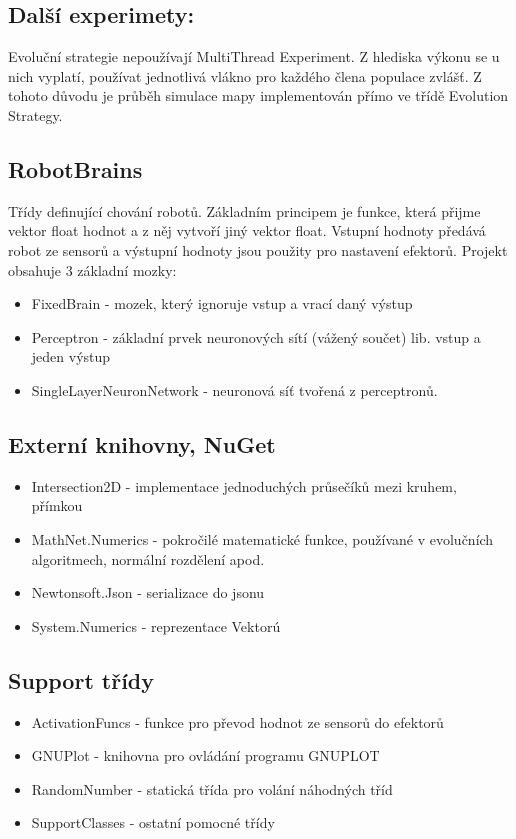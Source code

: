 \documentclass[12pt, oneside]{article}
\begin{document}
\subsection{Další experimety:}
Evoluční strategie nepoužívají MultiThread Experiment. Z hlediska výkonu se u nich vyplatí, používat jednotlivá vlákno pro každého člena populace zvlášť. Z tohoto důvodu je průběh simulace mapy implementován přímo ve třídě Evolution Strategy. 
\subsection{RobotBrains} 
Třídy definující chování robotů. Základním principem je funkce, která přijme vektor float hodnot a  z něj vytvoří jiný vektor float. Vstupní hodnoty předává robot ze sensorů a výstupní hodnoty jsou použity pro nastavení efektorů. Projekt obsahuje 3 základní mozky:
\begin{itemize}
\item FixedBrain - mozek, který ignoruje vstup a vrací daný výstup 
\item Perceptron - základní prvek neuronových sítí (vážený součet)  lib. vstup a jeden výstup
\item SingleLayerNeuronNetwork - neuronová síť tvořená z perceptronů.
\end{itemize}

\subsection{Externí knihovny, NuGet}
\begin{itemize}
\item Intersection2D - implementace jednoduchých průsečíků mezi kruhem, přímkou 
\item MathNet.Numerics - pokročilé matematické funkce, používané v evolučních  algoritmech, normální rozdělení apod.
\item Newtonsoft.Json - serializace do jsonu
\item System.Numerics - reprezentace Vektorú

\end{itemize} 
\subsection{Support třídy} 
\begin{itemize}
\item ActivationFuncs - funkce pro převod hodnot ze sensorů do efektorů
\item GNUPlot - knihovna pro ovládání programu GNUPLOT 
\item RandomNumber  - statická třída pro volání náhodných tříd
\item SupportClasses - ostatní pomocné třídy

\end{itemize}
\end{document}
